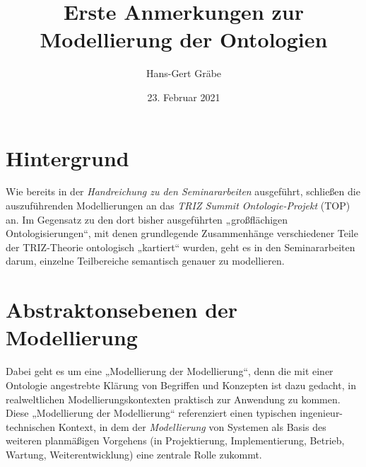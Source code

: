 \documentclass[11pt,a4paper]{article}
\title{Erste Anmerkungen zur Modellierung der Ontologien}
\author{Hans-Gert Gr\"abe}
\date{23. Februar 2021}
\begin{document}
\maketitle

\section{Hintergrund}

Wie bereits in der \emph{Handreichung zu den Seminararbeiten} ausgeführt,
schließen die auszufüh\-renden Modellierungen an das \emph{TRIZ Summit
  Ontologie-Projekt} (TOP) an.  Im Gegensatz zu den dort bisher ausgeführten
„großflächigen Ontologisierungen“, mit denen grundlegende Zusammenhänge
verschiedener Teile der TRIZ-Theorie ontologisch „kartiert“ wurden, geht es in
den Seminararbeiten darum, einzelne Teilbereiche semantisch genauer zu
modellieren.

\section{Abstraktonsebenen der Modellierung}

Dabei geht es um eine „Modellierung der Modellierung“, denn die mit einer
Ontologie angestrebte Klärung von Begriffen und Konzepten ist dazu gedacht, in
realweltlichen Modellierungskontexten praktisch zur Anwendung zu kommen.
Diese „Modellierung der Modellierung“ referenziert einen typischen
ingenieur-technischen Kontext, in dem der \emph{Modellierung} von Systemen als
Basis des weiteren planmäßigen Vorgehens (in Projektierung, Implementierung,
Betrieb, Wartung, Weiterentwicklung) eine zentrale Rolle zukommt.
\end{document}
